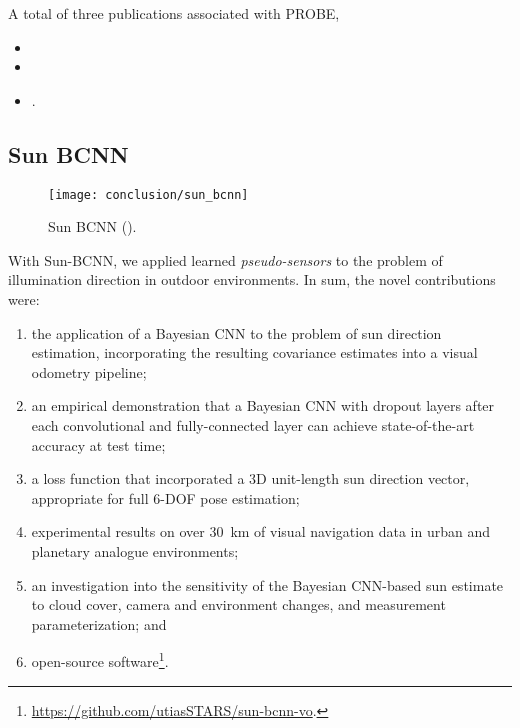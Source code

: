 \noindent A total of three publications associated with PROBE,
\begin{itemize}
	\item {}
	\item {}
	\item {}.
\end{itemize}


\subsection{Sun BCNN}

\begin{wrapfigure}{r}{0.3\textwidth}
  \begin{center}
  	\vspace{-20pt}
    \texttt{[image: conclusion/sun\_bcnn]}
     \vspace{-15pt}
  \end{center}
  \caption{Sun BCNN ().}
  \vspace{-5pt}
\end{wrapfigure}


With Sun-BCNN, we applied learned \textit{pseudo-sensors} to the problem of illumination direction in outdoor environments. In sum, the novel contributions were:
\begin{enumerate}
\item the application of a Bayesian CNN to the problem of sun direction estimation, incorporating the resulting covariance estimates into a visual odometry pipeline; 
\item an empirical demonstration that a Bayesian CNN with dropout layers after each convolutional and fully-connected layer can achieve state-of-the-art accuracy at test time;
\item a loss function that incorporated a 3D unit-length sun direction vector, appropriate for full 6-DOF pose estimation;
\item experimental results on over 30~km of visual navigation data in urban \citep{Geiger2012-fq} and planetary analogue \citep{Furgale2012-kk} environments; 
\item an investigation into the sensitivity of the Bayesian CNN-based sun estimate to cloud cover, camera and environment changes, and measurement parameterization; and
\item open-source software\footnote{\url{https://github.com/utiasSTARS/sun-bcnn-vo}.}.
\end{enumerate}

